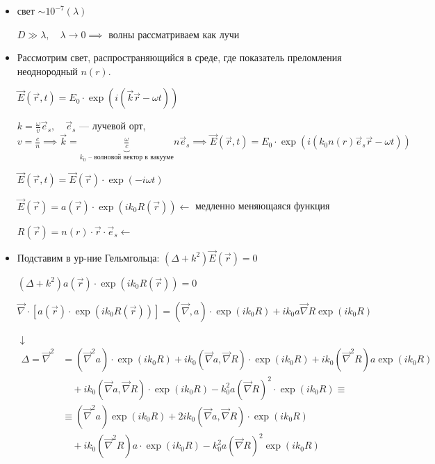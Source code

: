 \begin{itemize}
	\item свет $\sim 10^{-7} (\lambda)$
	
	$D \gg \lambda, \quad \lambda \to 0 \implies$ волны рассматриваем как лучи
	
	\item Рассмотрим свет, распространяющийся в среде, где показатель преломления неоднородный $n(r)$.
	
	$\vec{E}(\vec{r}, t) = E_0 \cdot \exp(i(\vec{k}\vec{r} - \omega t))$
	
	$k = \frac{\omega}{v} \vec{e}_s, \quad \vec{e}_s$ --- лучевой орт, $v = \frac{c}{n} \implies \vec{k} = \underbrace{\frac{\omega}{c}}_{k_0 \text{ -- волновой вектор в вакууме}} n \vec{e}_s \implies \vec{E}(\vec{r}, t) = E_0 \cdot \exp(i(k_0 n(r) \vec{e}_s \vec{r} - \omega t))$
	
	$\vec{E}(\vec{r}, t) = \vec{E}(\vec{r}) \cdot \exp(-i\omega t)$
	
	$\vec{E}(\vec{r}) = a(\vec{r}) \cdot \exp(ik_0 R(\vec{r})) \longleftarrow$ медленно меняющаяся функция
	
	$R(\vec{r}) = n(r) \cdot \vec{r} \cdot \vec{e}_s \longleftarrow$
	
	\item Подставим в ур-ние Гельмгольца: $(\Delta + k^2)\vec{E}(\vec{r}) = 0$
	
	$(\Delta + k^2) a(\vec{r}) \cdot \exp(ik_0 R(\vec{r})) = 0$
	
	$\vec{\nabla} \cdot [a(\vec{r}) \cdot \exp(ik_0 R(\vec{r}))] = (\vec{\nabla}, a) \cdot \exp(ik_0 R) + ik_0 a \vec{\nabla} R \exp(ik_0 R)$
	
	$\downarrow$
	\begin{equation*}
		\begin{aligned}
			\Delta = \vec{\nabla}^2 &= (\vec{\nabla}^2 a) \cdot \exp(ik_0 R) + i k_0 (\vec{\nabla} a, \vec{\nabla} R) \cdot \exp(ik_0 R) + i k_0 (\vec{\nabla}^2 R) a \exp(i k_0 R) \\
			&\quad + i k_0 (\vec{\nabla} a, \vec{\nabla} R) \cdot \exp(i k_0 R) - k_0^2 a (\vec{\nabla} R)^2 \cdot \exp(ik_0 R) \equiv \\
			&\equiv (\vec{\nabla}^2 a) \exp(ik_0 R) + 2 i k_0 (\vec{\nabla} a, \vec{\nabla} R) \cdot \exp(ik_0 R) \\
			&\quad + i k_0 (\vec{\nabla}^2 R) a \cdot \exp(ik_0 R) - k_0^2 a (\vec{\nabla} R)^2 \exp(ik_0 R)
		\end{aligned}
	\end{equation*}
	

\end{itemize}

